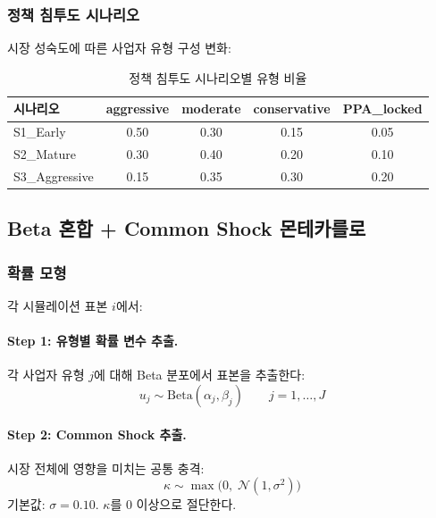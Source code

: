\documentclass[11pt, a4paper]{article}
\begin{document}
\subsubsection{정책 침투도 시나리오}

시장 성숙도에 따른 사업자 유형 구성 변화:

\begin{table}[H]
\centering
\caption{정책 침투도 시나리오별 유형 비율}\label{tab:penetration}
\small
\begin{tabular}{lcccc}
\toprule
\textbf{시나리오} & aggressive & moderate & conservative & PPA\_locked \\
\midrule
S1\_Early      & 0.50 & 0.30 & 0.15 & 0.05 \\
S2\_Mature     & 0.30 & 0.40 & 0.20 & 0.10 \\
S3\_Aggressive & 0.15 & 0.35 & 0.30 & 0.20 \\
\bottomrule
\end{tabular}
\end{table}

\subsection{Beta 혼합 + Common Shock 몬테카를로}\label{sec:monte_carlo}

\subsubsection{확률 모형}

각 시뮬레이션 표본 $i$에서:

\paragraph{Step 1: 유형별 확률 변수 추출.}
각 사업자 유형 $j$에 대해 Beta 분포에서 표본을 추출한다:
\begin{equation}\label{eq:beta_draw}
    u_j \sim \text{Beta}(\alpha_j, \beta_j) \qquad j = 1, \ldots, J
\end{equation}

\paragraph{Step 2: Common Shock 추출.}
시장 전체에 영향을 미치는 공통 충격:
\begin{equation}\label{eq:common_shock}
    \kappa \sim \max\!\big(0, \; \mathcal{N}(1, \sigma^2)\big)
\end{equation}
기본값: $\sigma = 0.10$. $\kappa$를 0 이상으로 절단한다.
\end{document}
